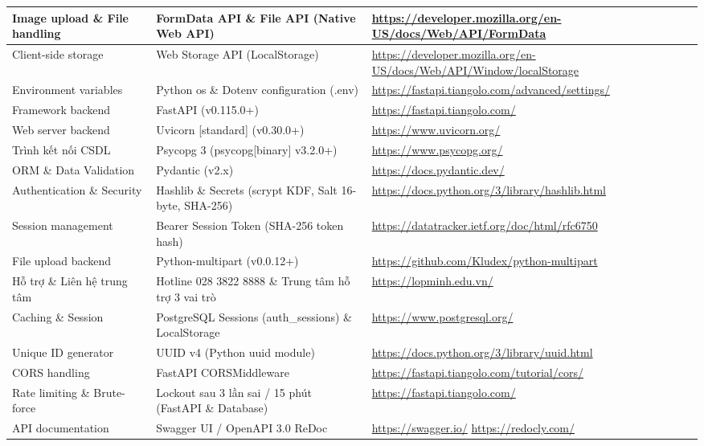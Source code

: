 \begin{longtable}{|>{\raggedright\arraybackslash}p{3.4cm}|>{\raggedright\arraybackslash}p{5.2cm}|>{\raggedright\arraybackslash}p{6.6cm}|}
    Image upload \& File handling & FormData API \& File API (Native Web API) & \url{https://developer.mozilla.org/en-US/docs/Web/API/FormData} \\ \hline
    Client-side storage & Web Storage API (LocalStorage) & \url{https://developer.mozilla.org/en-US/docs/Web/API/Window/localStorage} \\ \hline
    Environment variables & Python os \& Dotenv configuration (.env) & \url{https://fastapi.tiangolo.com/advanced/settings/} \\ \hline
    Framework backend & FastAPI (v0.115.0+) & \url{https://fastapi.tiangolo.com/} \\ \hline
    Web server backend & Uvicorn [standard] (v0.30.0+) & \url{https://www.uvicorn.org/} \\ \hline
    Trình kết nối CSDL & Psycopg 3 (psycopg[binary] v3.2.0+) & \url{https://www.psycopg.org/} \\ \hline
    ORM \& Data Validation & Pydantic (v2.x) & \url{https://docs.pydantic.dev/} \\ \hline
    Authentication \& Security & Hashlib \& Secrets (scrypt KDF, Salt 16-byte, SHA-256) & \url{https://docs.python.org/3/library/hashlib.html} \\ \hline
    Session management & Bearer Session Token (SHA-256 token hash) & \url{https://datatracker.ietf.org/doc/html/rfc6750} \\ \hline
    File upload backend & Python-multipart (v0.0.12+) & \url{https://github.com/Kludex/python-multipart} \\ \hline
    Hỗ trợ \& Liên hệ trung tâm & Hotline 028 3822 8888 \& Trung tâm hỗ trợ 3 vai trò & \url{https://lopminh.edu.vn/} \\ \hline
    Caching \& Session & PostgreSQL Sessions (auth\_sessions) \& LocalStorage & \url{https://www.postgresql.org/} \\ \hline
    Unique ID generator & UUID v4 (Python uuid module) & \url{https://docs.python.org/3/library/uuid.html} \\ \hline
    CORS handling & FastAPI CORSMiddleware & \url{https://fastapi.tiangolo.com/tutorial/cors/} \\ \hline
    Rate limiting \& Brute-force & Lockout sau 3 lần sai / 15 phút (FastAPI \& Database) & \url{https://fastapi.tiangolo.com/} \\ \hline
    API documentation & Swagger UI / OpenAPI 3.0 \newline ReDoc & \url{https://swagger.io/} \newline \url{https://redocly.com/} \\ \hline

\end{longtable}
